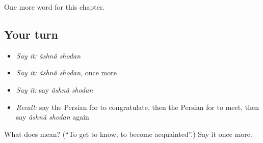 \begin{grammarlens}[title={What you've built}]
One more word for this chapter.
\end{grammarlens}

\subsection*{Your turn}
\begin{itemize}
\raggedright
  \item \emph{Say it:} \emph{âshnâ shodan}
  \item \emph{Say it:} \emph{âshnâ shodan}, once more
  \item \emph{Say it:} say \emph{âshnâ shodan}
  \item \emph{Recall:} say the Persian for to congratulate, then the Persian for to meet, then say \emph{âshnâ shodan} again
\end{itemize}

\begin{tcolorbox}[breakable,colback=teal!4,colframe=teal!35!black,title={Before you move on}]
What does   mean? (\textquotedblleft{}To get to know, to become acquainted\textquotedblright{}.) Say it once more.
\end{tcolorbox}
